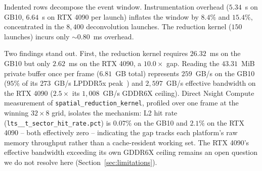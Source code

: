 \documentclass[conference]{IEEEtran}
\begin{document}
\begin{table}[htbp]
\caption{Layer~8 Profiling Breakdown, $32{\times}8\_256$, 150 Frames (ms, mean $\pm$ SD over 6 runs)}
\label{tab:breakdown}
\centering
{}

\vspace{0.5ex}
\begin{minipage}{\columnwidth}
\footnotesize
Indented rows decompose the event window. Instrumentation overhead ($5.34$~\textmu s on GB10, $6.64$~\textmu s on RTX 4090 per launch) inflates the window by $8.4\%$ and $15.4\%$, concentrated in the $8{,}400$ deconvolution launches. The reduction kernel ($150$ launches) incurs only $\sim$0.80~ms overhead.
\end{minipage}
\end{table}

Two findings stand out. First, the reduction kernel requires $26.32$~ms on the GB10 but only $2.62$~ms on the RTX 4090, a $10.0\times$ gap. Reading the $43.31$~MiB private buffer once per frame ($6.81$~GB total) represents $259$~GB/s on the GB10 ($95\%$ of its $273$~GB/s LPDDR5x peak~\cite{asusgx10_datasheet}) and $2{,}597$~GB/s effective bandwidth on the RTX 4090 ($2.5\times$ its $1{,}008$~GB/s GDDR6X ceiling). Direct Nsight Compute measurement of \texttt{spatial\_reduction\_kernel}, profiled over one frame at the winning $32{\times}8$ grid, isolates the mechanism: L2 hit rate (\texttt{lts\_\_t\_sector\_hit\_rate.pct}) is $0.07\%$ on the GB10 and $2.1\%$ on the RTX 4090 -- both effectively zero -- indicating the gap tracks each platform's raw memory throughput rather than a cache-resident working set. The RTX 4090's effective bandwidth exceeding its own GDDR6X ceiling remains an open question we do not resolve here (Section~\ref{sec:limitations}).
\end{document}
